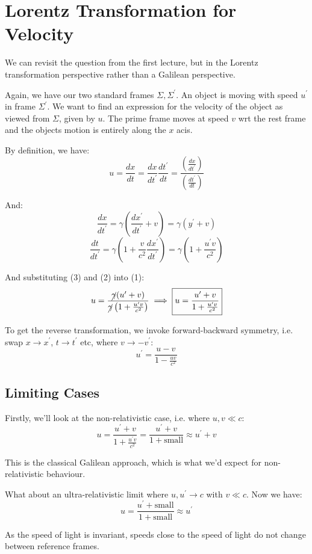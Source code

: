 \section{Lorentz Transformation for Velocity}
We can revisit the question from the first lecture, but in the Lorentz transformation perspective rather than a Galilean perspective.

Again, we have our two standard frames $\Sigma, \Sigma^\prime$. An object is moving with speed $u^\prime$ in frame $\Sigma^\prime$. We want to find an expression for the velocity of the object as viewed from $\Sigma$, given by $u$. The prime frame moves at speed $v$ wrt the rest frame and the objects motion is entirely along the $x$ acis.

By definition, we have:
\[
    u = \frac{dx}{dt} = \frac{dx}{dt^\prime} \frac{dt^\prime}{dt} = \frac{\left(\frac{dx}{dt^\prime}\right)}{\left(\frac{dt^\prime}{dt}\right)} \tag{1}
\]

And:
\[
    \frac{dx}{dt^\prime} = \gamma \left(\frac{dx^\prime}{dt^\prime} + v\right) = \gamma(y^\prime + v) \tag{2}
\]
\[
    \frac{dt}{dt^\prime} = \gamma \left(1 + \frac{v}{c^2} \frac{dx^\prime}{dt^\prime}\right) = \gamma \left(1 + \frac{u^\prime v}{c^2}\right) \tag{3}
\]

And substituting (3) and (2) into (1):
\[
    u = \frac{\cancel{\gamma} (u^\prime + v)}{\cancel{\gamma} \left(1 + \frac{u^\prime v}{c^2}\right)} \implies \boxed{u = \frac{u^\prime + v}{1 + \frac{u^\prime v}{c^2}}}
\]

To get the reverse transformation, we invoke forward-backward symmetry, i.e. swap $x \to x^\prime$, $t\to t^\prime$ etc, where $v \to -v^\prime$:
\[
    u^\prime = \frac{u-v}{1 - \frac{uv}{c^2}}
\]

\subsection{Limiting Cases}
Firstly, we'll look at the non-relativistic case, i.e. where $u, v \ll c$:
\[
    u = \frac{u^\prime+v}{1 + \frac{u^\prime v}{c^2}} = \frac{u^\prime + v}{1 + \text{small}} \approx u^\prime + v
\]

This is the classical Galilean approach, which is what we'd expect for non-relativistic behaviour.

What about an ultra-relativistic limit where $u, u^\prime \to c$ with $v \ll c$. Now we have:
\[
    u = \frac{u^\prime + \text{small}}{1 + \text{small}} \approx u^\prime
\]

As the speed of light is invariant, speeds close to the speed of light do not change between reference frames.

